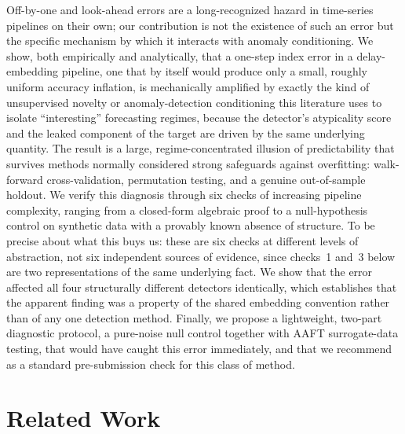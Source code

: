 \documentclass[preprint,12pt]{elsarticle}
\begin{document}
Off-by-one and look-ahead errors are a long-recognized hazard in time-series pipelines on their
own; our contribution is not the existence of such an error but the specific mechanism by which
it interacts with anomaly conditioning. We show, both empirically and analytically, that a
one-step index error in a delay-embedding pipeline, one that by itself would produce only a
small, roughly uniform accuracy inflation, is mechanically amplified by exactly the kind of
unsupervised novelty or anomaly-detection conditioning this literature uses to isolate
``interesting'' forecasting regimes, because the detector's atypicality score and the leaked
component of the target are driven by the same underlying quantity. The result is a large,
regime-concentrated illusion of predictability that survives methods normally considered strong
safeguards against overfitting: walk-forward cross-validation, permutation testing, and a
genuine out-of-sample holdout. We verify this diagnosis through six checks of increasing
pipeline complexity, ranging from a closed-form algebraic proof to a null-hypothesis control on
synthetic data with a provably known absence of structure. To be precise about what this buys us: these are
six checks at different levels of abstraction, not six independent sources of evidence, since
checks~1 and~3 below are two representations of the same underlying fact. We show that the
error affected all four structurally different detectors identically, which establishes that
the apparent finding was a property of the shared embedding convention rather than of any one
detection method. Finally, we propose a lightweight, two-part diagnostic protocol, a pure-noise
null control together with AAFT surrogate-data testing, that would have caught this error
immediately, and that we recommend as a standard pre-submission check for this class of method.

\section{Related Work}
\end{document}
